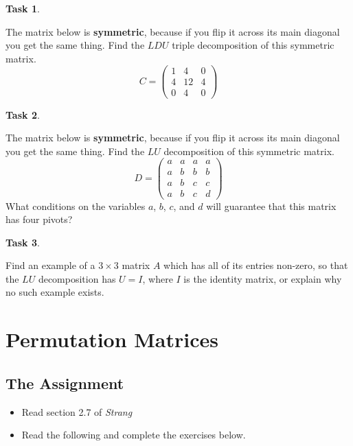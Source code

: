 \documentclass[10pt,]{book}
\newcommand{\terminology}[1]{\textbf{#1}}
\theoremstyle{plain}
\theoremstyle{definition}
\numberwithin{equation}{section}
\newtheorem{task}{Task}[chapter]
\begin{document}
\begin{task}
\label{task-73}

      The matrix below is \terminology{symmetric}, because if you flip it
      across its main diagonal you get the same thing. Find the \(LDU\)
      triple decomposition of this symmetric matrix.
      \[
        C =
        \begin{pmatrix}
        1 & 4 & 0 \\
        4 & 12 & 4 \\
        0 & 4 & 0
        \end{pmatrix}
      \]\end{task}
\begin{task}
\label{task-74}

      The matrix below is \terminology{symmetric}, because if you flip it
      across its main diagonal you get the same thing. Find the \(LU\)
      decomposition of this symmetric matrix.
      \[
        D =
        \begin{pmatrix}
        a & a & a & a \\
        a & b & b & b \\
        a & b & c & c \\
        a & b & c & d
        \end{pmatrix}
      \]
      What conditions on the variables \(a\), \(b\), \(c\),
      and \(d\) will guarantee that this matrix has four pivots?
    \end{task}
\begin{task}
\label{task-75}

      Find an example of a \(3\times 3\) matrix \(A\) which has all of
      its entries non-zero, so that the \(LU\) decomposition has
      \(U = I\), where \(I\) is the identity matrix, or explain why no
      such example exists.
    \end{task}
\clearpage
\typeout{************************************************}
\typeout{************************************************}
\section[Permutation Matrices]{Permutation Matrices}\label{permutations}
\typeout{************************************************}
\typeout{************************************************}
\subsection[The Assignment]{The Assignment}\label{subsection-51}
\begin{itemize}
\item{}Read section 2.7 of \emph{Strang}\item{}Read the following and complete the exercises below.\end{itemize}
\typeout{************************************************}
\typeout{************************************************}
\end{document}
